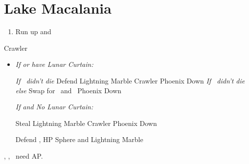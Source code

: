 \chapter{Lake Macalania}

\begin{enumerate}
  \item Run up and \sd
\end{enumerate}
\begin{battle}[1600]{Crawler}
  \begin{itemize}
    \switch{\tidus}{\rikku}
    \rikkuf Lightning Marble x1/2 Negator
    \rikkuf Lightning Marble Crawler
    \kimahrif Lightning Marble Crawler
    \luluf Phoenix Down \rikku
    \item \textit{If \blitzwin or have Lunar Curtain:}
    \begin{itemize}
    \switch{\kimahri}{\yuna} \textit{If \kimahri\ didn't die}
    \yunaf Defend
    \rikkuf Lightning Marble Crawler
    \luluf Phoenix Down \rikku \textit{If \kimahri\ didn't die else} Swap for \yuna\ and \yuna\ Phoenix Down \rikku
    \end{itemize}
    \textit{If \blitzloss and No Lunar Curtain:}
    \begin{itemize}
    \kimahrif Steal
    \rikkuf Lightning Marble Crawler
    \switch{\lulu}{\yuna}
    \yunaf Phoenix Down \rikku
    \end{itemize}
    \switch{\yuna}{\tidus}
    \tidusf Defend
    \rikkuf \od, HP Sphere and Lightning Marble
  \end{itemize}
\tidus, \yuna, \lulu\ need AP.
\end{battle}
